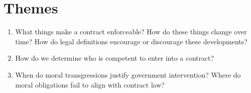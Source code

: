 \section{Themes}

\begin{enumerate}
    \item What things make a contract enforceable? How do these things change 
    over time? How do legal definitions encourage or discourage these 
    developments?
    \item How do we determine who is competent to enter into a contract?
    \item When do moral transgressions justify government intervention? Where 
    do moral obligations fail to align with contract law?
\end{enumerate}

